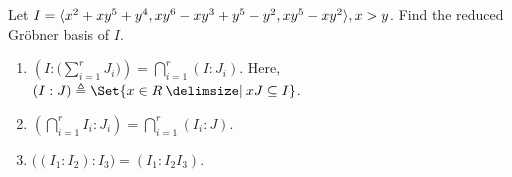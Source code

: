 \begin{exercise}
  Let $I = \langle x^2+xy^5+y^4, xy^6-xy^3+y^5-y^2, xy^5-xy^2\rangle, x > y$.
  Find the reduced Gr\"obner basis of $I$.
\end{exercise}

\begin{exercise} \mbox{}
  \begin{enumerate}
    \item $\left( I : \big( \sum\limits_{i=1}^r J_i \big) \right)
      = \bigcap\limits_{i=1}^r (I: J_i)$.
      Here, $(I:J) \triangleq \Set{ x\in R \given xJ \subseteq I }$.
    \item $\left( \bigcap\limits_{i=1}^r I_i : J_i \right) =
      \bigcap\limits_{i=1}^r \left( I_i : J \right)$.
    \item $\big((I_1 : I_2) : I_3 \big) = (I_1 : I_2 I_3)$.
  \end{enumerate}
\end{exercise}
